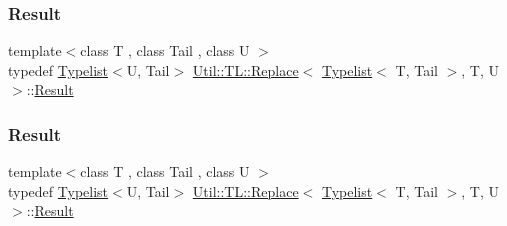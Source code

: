 \subsubsection{\texorpdfstring{Result}{Result}\hspace{0.1cm}{\footnotesize\ttfamily [1/3]}}
{\footnotesize\ttfamily template$<$class T , class Tail , class U $>$ \\
typedef \mbox{\hyperlink{structUtil_1_1Typelist}{Typelist}}$<$U, Tail$>$ \mbox{\hyperlink{structUtil_1_1TL_1_1Replace}{Util\+::\+T\+L\+::\+Replace}}$<$ \mbox{\hyperlink{structUtil_1_1Typelist}{Typelist}}$<$ T, Tail $>$, T, U $>$\+::\mbox{\hyperlink{structUtil_1_1TL_1_1Replace_3_01Typelist_3_01T_00_01Tail_01_4_00_01T_00_01U_01_4_a673e2d2a7c26a530c7015a04bde5a506}{Result}}}

\mbox{\label{structUtil_1_1TL_1_1Replace_3_01Typelist_3_01T_00_01Tail_01_4_00_01T_00_01U_01_4_a673e2d2a7c26a530c7015a04bde5a506}} 
\subsubsection{\texorpdfstring{Result}{Result}\hspace{0.1cm}{\footnotesize\ttfamily [2/3]}}
{\footnotesize\ttfamily template$<$class T , class Tail , class U $>$ \\
typedef \mbox{\hyperlink{structUtil_1_1Typelist}{Typelist}}$<$U, Tail$>$ \mbox{\hyperlink{structUtil_1_1TL_1_1Replace}{Util\+::\+T\+L\+::\+Replace}}$<$ \mbox{\hyperlink{structUtil_1_1Typelist}{Typelist}}$<$ T, Tail $>$, T, U $>$\+::\mbox{\hyperlink{structUtil_1_1TL_1_1Replace_3_01Typelist_3_01T_00_01Tail_01_4_00_01T_00_01U_01_4_a673e2d2a7c26a530c7015a04bde5a506}{Result}}}

\mbox{\label{structUtil_1_1TL_1_1Replace_3_01Typelist_3_01T_00_01Tail_01_4_00_01T_00_01U_01_4_a673e2d2a7c26a530c7015a04bde5a506}} 
